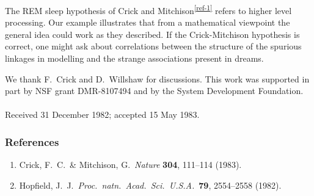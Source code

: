 \documentclass[11pt,letterpaper]{article}
\begin{document}
	The REM sleep hypothesis of Crick and Mitchison\textsuperscript{\ref{ref-1}} refers to higher level processing. Our example illustrates that from a mathematical viewpoint the general idea could work as they described. If the Crick-Mitchison hypothesis is correct, one might ask about correlations between the structure of the spurious linkages in modelling and the strange associations present in dreams.
	
	We thank F.~Crick and D.~Willshaw for discussions. This work was supported in part by NSF grant DMR-8107494 and by the System Development Foundation.
	\\
	\\
	Received 31 December 1982; accepted 15 May 1983.
	
	\subsubsection*{References}
	\begin{enumerate}
		\item Crick, F.~C.~\& Mitchison, G.~\textit{Nature} \textbf{304}, 111--114 (1983). \label{ref-1}
		\item Hopfield, J.~J.~\textit{Proc.~natn.~Acad.~Sci.~U.S.A.}~\textbf{79}, 2554--2558 (1982). \label{ref-2}
	\end{enumerate}
\end{document}
